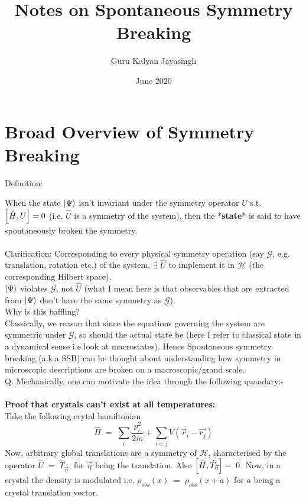 \documentclass[12pt]{article}
\title{\Huge{Notes on Spontaneous Symmetry Breaking}}
\author{\Large{Guru Kalyan Jayasingh}}
\date{\Large{June 2020}}
\begin{document}
\begin{titlingpage}
\maketitle
\end{titlingpage}



\large
\section{Broad Overview of Symmetry Breaking}
Definition:

When the state $\ket{\Psi}$ isn't invariant under the symmetry operator $\hat{U}$
s.t. $\comm{\hat{H}}{U}=0$ (i.e. $\hat{U}$ is a symmetry of the system), then the *\textbf{state}* is said to have spontaneously broken the symmetry.\\
\\
Clarification: Corresponding to every physical symmetry operation (say $\mathcal{G}$, e.g. translation, rotation etc.) of the system, $\exists$ $\hat{U}$ to implement it in $\mathscr{H}$ (the corresponding Hilbert space). \\
$\ket{\Psi}$ violates $\mathcal{G}$, not $\hat{U}$ (what I mean here is that observables that are extracted from $\ket{\Psi}$ don't have the same symmetry as $\mathcal{G}$). \\
\newline
Why is this baffling?\\
Classically, we reason that since the equations governing the system are symmetric under $\mathcal{G}$, so should the actual state be (here I refer to classical state in a dynamical sense i.e look at macrostates). Hence Spontaneous symmetry breaking (a.k.a SSB) can be thought about understanding how symmetry in microscopic descriptions are broken on a macroscopic/grand scale.\\
Q. Mechanically, one can motivate the idea through the following quandary:-\\
\\
\textbf{Proof that crystals can't exist at all temperatures:}\\
Take the following crytal hamiltonian
$$\hat{H}\;=\;\sum_i \frac{p_i^2}{2m}+\sum_{i<j}V(\Vec{r}_i-\Vec{r_j})$$
Now, arbitrary global translations are a symmetry of $\mathcal{H}$, characterised by the operator $\hat{U}\;=\;\hat{T}_{\Vec{\eta}}$, for $\Vec{\eta}$ being the translation. Also $\comm{\hat{H}}{\hat{T}_{\Vec{\eta}}}=\;0$. Now, in a crystal the density is modulated i.e. $\rho_{obs}(x)\;=\;\rho_{obs}(x+a)$ for $a$ being a crystal translation vector.\\
\end{document}
